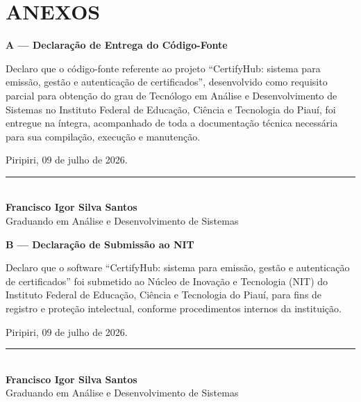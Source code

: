 \documentclass[12pt,openright,oneside,a4paper]{article}
\newcounter{rn}
\begin{document}
\newpage



\newpage
\section{ANEXOS}

\textbf{A --- Declaração de Entrega do Código-Fonte}

Declaro que o código-fonte referente ao projeto ``CertifyHub: sistema para emissão, gestão e autenticação de certificados'', desenvolvido como requisito parcial para obtenção do grau de Tecnólogo em Análise e Desenvolvimento de Sistemas no Instituto Federal de Educação, Ciência e Tecnologia do Piauí, foi entregue na íntegra, acompanhado de toda a documentação técnica necessária para sua compilação, execução e manutenção.

\vspace{4cm}

Piripiri, 09 de julho de 2026.

\vspace{2cm}
\begin{flushright}
\rule{8cm}{0.4pt}\\
\textbf{Francisco Igor Silva Santos}\\
Graduando em Análise e Desenvolvimento de Sistemas
\end{flushright}

\newpage

\textbf{B --- Declaração de Submissão ao NIT}

Declaro que o software ``CertifyHub: sistema para emissão, gestão e autenticação de certificados'' foi submetido ao Núcleo de Inovação e Tecnologia (NIT) do Instituto Federal de Educação, Ciência e Tecnologia do Piauí, para fins de registro e proteção intelectual, conforme procedimentos internos da instituição.

\vspace{4cm}

Piripiri, 09 de julho de 2026.

\vspace{2cm}
\begin{flushright}
\rule{8cm}{0.4pt}\\
\textbf{Francisco Igor Silva Santos}\\
Graduando em Análise e Desenvolvimento de Sistemas
\end{flushright}
\end{document}
